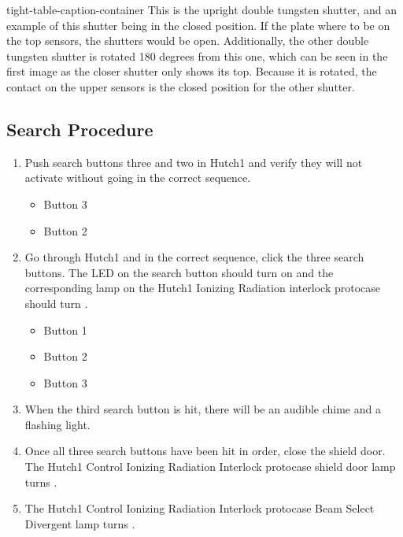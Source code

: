 \documentclass[letterpaper,10pt,english]{sphinxmanual}
\begin{document}
\begin{sphinxuseclass}{tight-table-caption-container}
\sphinxAtStartPar
{} This is the upright double tungsten shutter, and an example of this shutter being in the closed position. If the plate where to be on the top sensors, the shutters would be open. Additionally, the other double tungsten shutter is rotated 180 degrees from this one, which can be seen in the first image as the closer shutter only shows its top. Because it is rotated, the contact on the upper sensors is the closed position for the other shutter.

\end{sphinxuseclass}

\subsection{Search Procedure}
\label{\detokenize{testing_documentation/Hutch-1_ionizing_radiation:search-procedure}}\begin{enumerate}
%
\item {} 
\sphinxAtStartPar
Push search buttons three and two in Hutch\sphinxhyphen{}1 and verify they will not activate without going in the correct sequence.
\begin{itemize}
\item {} 
\sphinxAtStartPar
Button 3

\item {} 
\sphinxAtStartPar
Button 2

\end{itemize}

\item {} 
\sphinxAtStartPar
Go through Hutch\sphinxhyphen{}1 and in the correct sequence, click the three search buttons. The LED on the search button should turn on and the corresponding lamp on the Hutch\sphinxhyphen{}1 Ionizing Radiation interlock protocase should turn .
\begin{itemize}
\item {} 
\sphinxAtStartPar
Button 1

\item {} 
\sphinxAtStartPar
Button 2

\item {} 
\sphinxAtStartPar
Button 3

\end{itemize}

\item {} 
\sphinxAtStartPar
When the third search button is hit, there will be an audible chime and a flashing light.

\item {} 
\sphinxAtStartPar
Once all three search buttons have been hit in order, close the shield door. The Hutch\sphinxhyphen{}1 Control Ionizing Radiation Interlock protocase shield door lamp turns .

\item {} 
\sphinxAtStartPar
The Hutch\sphinxhyphen{}1 Control Ionizing Radiation Interlock protocase Beam Select Divergent lamp turns .

\end{enumerate}
\end{document}
